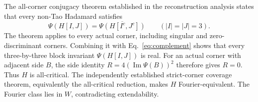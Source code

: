 %
%

The all-corner conjugacy theorem established in the reconstruction analysis
states that every non-Tao Hadamard satisfies
\begin{equation}
 \Psi(H[I,J])=\overline{\Psi(H[I^c,J^c])}
 \qquad (|I|=|J|=3).
 \label{eq:all-corner-conjugacy}
\end{equation}
The theorem applies to every actual corner, including singular and
zero-discriminant corners. Combining it with
Eq.~\eqref{eq:complement} shows that every three-by-three block invariant
$\Psi(H[I,J])$ is real. For an actual corner with adjacent side $B$, the
side identity $R=4(\operatorname{Im}\Psi(B))^2$ therefore gives $R=0$.
Thus $H$ is all-critical. The independently established strict-corner
coverage theorem, equivalently the all-critical reduction, makes $H$
Fourier-equivalent. The Fourier class lies in $W$, contradicting
extendability.

